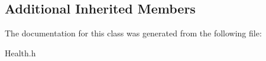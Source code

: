 \subsection*{Additional Inherited Members}


The documentation for this class was generated from the following file\+:\begin{DoxyCompactItemize}
\item 
Health.\+h\end{DoxyCompactItemize}
